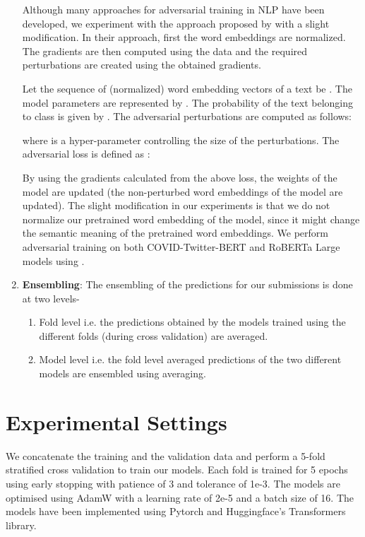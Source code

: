 \documentclass[11pt,a4paper]{article}
\begin{document}
\begin{enumerate}
Although many approaches for adversarial training in NLP have been developed, we experiment with the approach proposed by \citet{miyato2016adversarial} with a slight modification. In their approach, first the word embeddings are normalized. The gradients are then computed using the data and the required perturbations are created using the obtained gradients.

Let the sequence of (normalized) word embedding vectors of a text be \bm{}. The model parameters are represented by \bm{}. The probability of the text belonging to class  is given by . The adversarial perturbations  are computed as follows: 

\vspace{-0.05cm}


\vspace{-0.95cm}



where  is a hyper-parameter controlling the size of the perturbations. The adversarial loss is defined as :
\vspace{-0.05cm}


By using the gradients calculated from the above loss, the weights of the model are updated (the non-perturbed word embeddings of the model are updated). The slight modification in our experiments is that we do not normalize our pretrained word embedding of the model, since it might change the semantic meaning of the pretrained word embeddings. We perform adversarial training on both COVID-Twitter-BERT and RoBERTa Large models using  .

\item {\bf Ensembling}: The ensembling of the predictions for our submissions is done at two levels- 
\begin{enumerate}
    \item Fold level i.e. the predictions obtained by the models trained using the different folds (during cross validation) are averaged.
    
    \item Model level i.e. the fold level averaged predictions of the two different models are ensembled using averaging.
 
\end{enumerate}

\end{enumerate}


\section{Experimental Settings}
\label{sec:exp_set}
We concatenate the training and the validation data and perform a 5-fold stratified cross validation to train our models. Each fold is trained for 5 epochs using early stopping with patience of 3 and tolerance of 1e-3. The models are optimised using AdamW \citep{DBLP:journals/corr/abs-1711-05101} with a learning rate of 2e-5 and a batch size of 16. The models have been implemented using Pytorch \citep{paszke2019pytorch} and Huggingface's Transformers \citep{wolf2019transformers} library.
\end{document}
